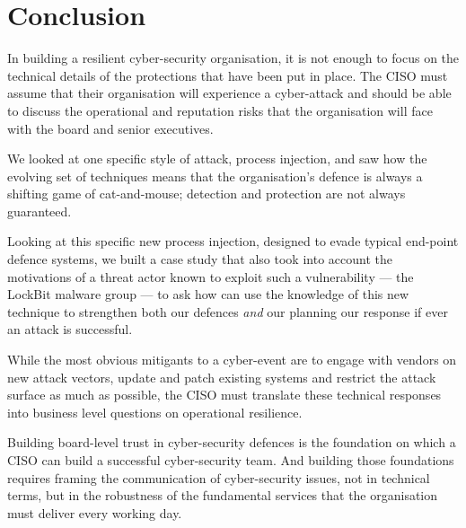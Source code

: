 \section{Conclusion}

In building a resilient cyber-security organisation, it is not enough to focus on the technical details of the protections that
have been put in place.  The CISO must assume that their organisation will experience a cyber-attack and should be able to discuss
the operational and reputation risks that the organisation will face with the board and senior executives.

We looked at one specific style of attack, process injection, and saw how the evolving set of techniques means that the
organisation's defence is always a shifting game of cat-and-mouse; detection and protection are not always guaranteed.

Looking at this specific new process injection, designed to evade typical end-point defence systems, we built a case study that
also took into account the motivations of a threat actor known to exploit such a vulnerability --- the LockBit malware group ---
to ask how can  use the knowledge of this new technique to strengthen both our defences \textit{and} our planning our response if ever an
attack is successful.

While the most obvious mitigants to a cyber-event are to engage with vendors on new attack vectors, update and patch existing systems and
restrict the attack surface as much as possible, the CISO must translate these technical responses into business level questions on operational
resilience.

Building board-level trust in cyber-security defences is the foundation on which a CISO can build a successful cyber-security team.  And
building those foundations requires framing the communication of cyber-security issues, not in technical terms, but in the robustness
of the fundamental services that the organisation must deliver every working day.




